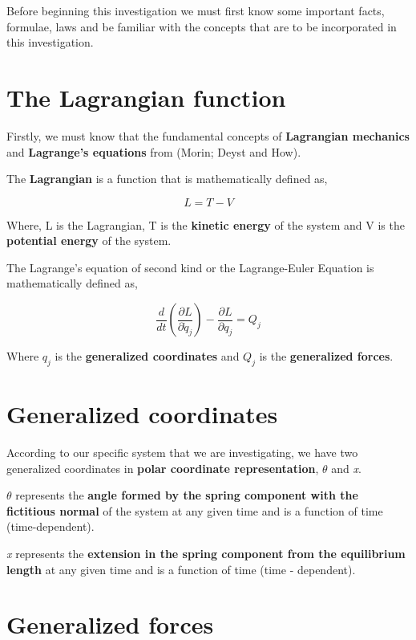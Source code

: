 {Before beginning this investigation we must first know some important facts, formulae, laws and be familiar with the concepts that are to be incorporated in this investigation.}

\section{{The Lagrangian function}}
        
    {Firstly, we must know that the fundamental concepts of \textbf{Lagrangian mechanics} and \textbf{Lagrange's equations} from (Morin; Deyst and How).}
        
    {The \textbf{Lagrangian} is a function that is mathematically defined as,}
        
    $$L = T - V$$
        
    {Where, L is the Lagrangian, T is the \textbf{kinetic energy} of the system and V is the \textbf{potential energy} of the system.}
        
    {The Lagrange's equation of second kind or the Lagrange-Euler Equation is mathematically defined as,}
        
    $$\frac{d}{dt}\left(\frac{\partial L}{\partial \dot{q}_j}\right) - \frac{\partial L}{\partial q_j} = Q_j$$
        
    {Where $q_j$ is the \textbf{generalized coordinates} and $Q_j$ is the \textbf{generalized forces}.}
      
    \section{{Generalized coordinates}}
        
    {According to our specific system that we are investigating, we have two generalized coordinates in \textbf{polar coordinate representation}, $\theta$ and \textit{x}.}
        
    {$\theta$ represents the \textbf{angle formed by the spring component with the fictitious normal} of the system at any given time and is a function of time (time-dependent).}
        
    {\textit{x} represents the \textbf{extension in the spring component from the equilibrium length} at any given time and is a function of time (time - dependent).}
            
    \section{{Generalized forces}}
        
